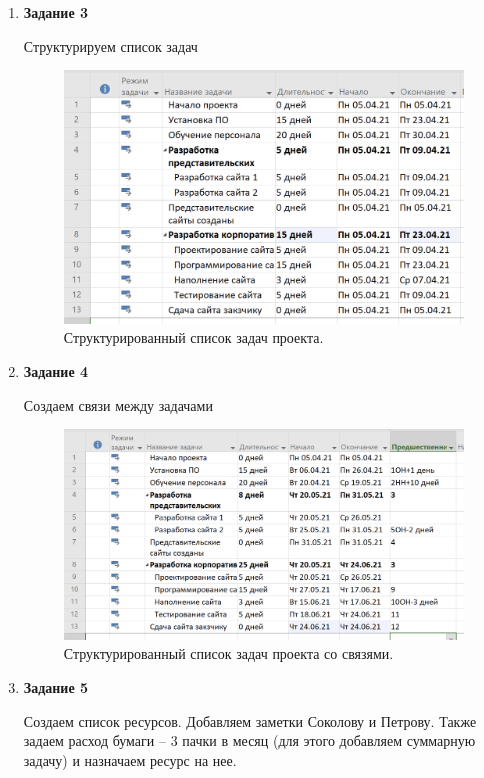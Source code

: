 \documentclass[a4paper,14pt]{extreport} %
\begin{document}
\begin{enumerate}
\item \textbf{Задание 3}

Структурируем список задач

\begin{figure}[H]
  \centering
  \caption{Структурированный список задач проекта. }
  \includegraphics[scale=0.6]{5}
\end{figure}

\item \textbf{Задание 4}

Создаем связи между задачами

\begin{figure}[H]
  \centering
  \caption{Структурированный список задач проекта со связями. }
  \includegraphics[scale=0.6]{6}
\end{figure}

\item \textbf{Задание 5}

Создаем список ресурсов. Добавляем заметки Соколову и Петрову. Также задаем расход бумаги -- 3 пачки в месяц (для этого добавляем суммарную задачу) и назначаем ресурс на нее.


\end{enumerate}
\end{document}
